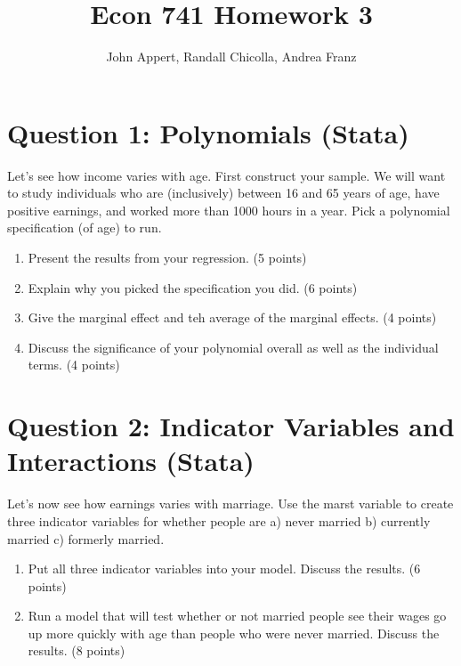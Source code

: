 \documentclass{article}
\begin{document}
\title{Econ 741 Homework 3}
\author{John Appert, Randall Chicolla, Andrea Franz}
\maketitle

\section{Question 1:  Polynomials (Stata)}
Let’s see how income varies with age. First construct your sample. We will want to
study individuals who are (inclusively) between 16 and 65 years of age, have positive earnings, and worked more than 1000 hours in a year. Pick a polynomial specification (of age) to run.

\begin{enumerate}[label=\alph*]
\item Present the results from your regression.  (5 points)

\item Explain why you picked the specification you did.  (6 points)

\item  Give the marginal effect and teh average of the marginal effects.  (4 points)

\item  Discuss the significance of your polynomial overall as well as the individual terms.  (4 points)

\end{enumerate}

\section{Question 2:  Indicator Variables and Interactions  (Stata)}
Let’s now see how earnings varies with marriage. Use the marst variable to create
three indicator variables for whether people are a) never married b) currently married c) formerly married.

\begin{enumerate}[label=\alph*]
\item  Put all three indicator variables into your model. Discuss the results. (6 points)

\item Run a model that will test whether or not married people see their wages go up
more quickly with age than people who were never married. Discuss the results.
(8 points)

\end{enumerate}
\end{document}
